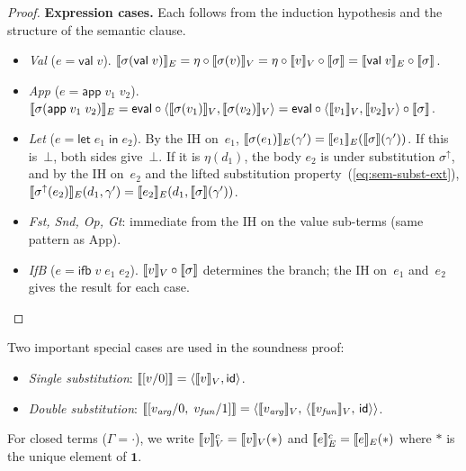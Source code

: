 \begin{proof}
\medskip\noindent
\textbf{Expression cases.}  Each follows from the induction hypothesis
and the structure of the semantic clause.
\begin{itemize}
  \item \emph{Val} ($e = \mathsf{val}\;v$).
    $\llbracket \sigma(\mathsf{val}\;v) \rrbracket_E
    = \eta \circ \llbracket \sigma(v) \rrbracket_V
    = \eta \circ \llbracket v \rrbracket_V \circ \llbracket \sigma \rrbracket
    = \llbracket \mathsf{val}\;v \rrbracket_E \circ \llbracket \sigma \rrbracket$.

  \item \emph{App} ($e = \mathsf{app}\;v_1\;v_2$).
    $\llbracket \sigma(\mathsf{app}\;v_1\;v_2) \rrbracket_E
    = \mathsf{eval} \circ
      \langle \llbracket \sigma(v_1) \rrbracket_V, \llbracket \sigma(v_2) \rrbracket_V \rangle
    = \mathsf{eval} \circ
      \langle \llbracket v_1 \rrbracket_V, \llbracket v_2 \rrbracket_V \rangle \circ \llbracket \sigma \rrbracket$.

  \item \emph{Let} ($e = \mathsf{let}\;e_1\;\mathsf{in}\;e_2$).
    By the IH on~$e_1$,
    $\llbracket \sigma(e_1) \rrbracket_E(\gamma') = \llbracket e_1 \rrbracket_E(\llbracket \sigma \rrbracket(\gamma'))$.
    If this is~$\bot$, both sides give~$\bot$.  If it is
    $\eta(d_1)$, the body $e_2$ is under substitution
    $\sigma^{\uparrow}$, and by the IH on~$e_2$
    and the lifted substitution property~(\ref{eq:sem-subst-ext}),
    $\llbracket \sigma^{\uparrow}(e_2) \rrbracket_E(d_1, \gamma')
    = \llbracket e_2 \rrbracket_E(d_1, \llbracket \sigma \rrbracket(\gamma'))$.

  \item \emph{Fst, Snd, Op, Gt}:  immediate from the IH on the
    value sub-terms (same pattern as App).

  \item \emph{IfB} ($e = \mathsf{ifb}\;v\;e_1\;e_2$).
    $\llbracket v \rrbracket_V \circ \llbracket \sigma \rrbracket$ determines the branch; the IH
    on~$e_1$ and~$e_2$ gives the result for each case.
\end{itemize}
\vspace{-0.5em}
\end{proof}

Two important special cases are used in the soundness proof:
\begin{itemize}
  \item \emph{Single substitution}: $\llbracket [v/0] \rrbracket = \langle \llbracket v \rrbracket_V,
    \mathsf{id} \rangle$.
  \item \emph{Double substitution}: $\llbracket [v_{\mathit{arg}}/0,\;
    v_{\mathit{fun}}/1] \rrbracket = \langle \llbracket v_{\mathit{arg}} \rrbracket_V,\, \langle
    \llbracket v_{\mathit{fun}} \rrbracket_V,\, \mathsf{id} \rangle \rangle$.
\end{itemize}

For closed terms ($\Gamma = \cdot$), we write $\llbracket v \rrbracket^c_V = \llbracket v \rrbracket_V
(\ast)$ and $\llbracket e \rrbracket^c_E = \llbracket e \rrbracket_E(\ast)$ where $\ast$ is the unique
element of $\mathbf{1}$.


